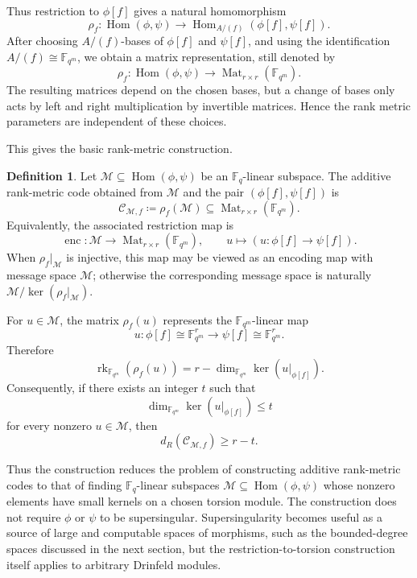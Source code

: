 \documentclass[10pt,a4paper]{amsart}
\DeclareMathOperator{\Hom}{Hom}
\DeclareMathOperator{\Mat}{Mat}
\DeclareMathOperator{\rk}{rk}
\DeclareMathOperator{\enc}{enc}
\theoremstyle{definition}
\newtheorem{definition}{Definition}[section]
\theoremstyle{plain}
\theoremstyle{remark}
\newcommand{\vF}{\mathbb F}
\begin{document}
Thus restriction to $\phi[f]$ gives a natural homomorphism
$$
\rho_f:\Hom(\phi,\psi)\longrightarrow \Hom_{A/(f)}(\phi[f],\psi[f]).
$$
After choosing $A/(f)$-bases of $\phi[f]$ and $\psi[f]$, and using the identification $A/(f)\cong \vF_{q^m}$, we obtain a matrix representation, still denoted by
$$
\rho_f:\Hom(\phi,\psi)\longrightarrow \Mat_{r\times r}(\vF_{q^m}).
$$
The resulting matrices depend on the chosen bases, but a change of bases only acts by left and right multiplication by invertible matrices. Hence the rank metric parameters are independent of these choices.

This gives the basic rank-metric construction.

\begin{definition}
Let $\mathcal M\subseteq \Hom(\phi,\psi)$ be an $\vF_q$-linear subspace. The additive rank-metric code obtained from $\mathcal M$ and the pair $(\phi[f],\psi[f])$ is
$$
\mathcal C_{\mathcal M,f}\coloneqq \rho_f(\mathcal M)
\subseteq \Mat_{r\times r}(\vF_{q^m}).
$$
Equivalently, the associated restriction map is
$$
\enc:\mathcal M\longrightarrow \Mat_{r\times r}(\vF_{q^m}),
\qquad
u\longmapsto \left(u:\phi[f]\rightarrow\psi[f]\right).
$$
When $\rho_f|_{\mathcal M}$ is injective, this map may be viewed as an encoding map with message space $\mathcal M$; otherwise the corresponding message space is naturally $\mathcal M/\ker(\rho_f|_{\mathcal M})$.
\end{definition}

For $u\in\mathcal M$, the matrix $\rho_f(u)$ represents the $\vF_{q^m}$-linear map
$$
u:\phi[f]\cong \vF_{q^m}^r\longrightarrow\psi[f]\cong \vF_{q^m}^r.
$$
Therefore
$$
\rk_{\vF_{q^m}}(\rho_f(u))
=
r-\dim_{\vF_{q^m}}\ker\left(u|_{\phi[f]}\right).
$$
Consequently, if there exists an integer $t$ such that
$$
\dim_{\vF_{q^m}}\ker\left(u|_{\phi[f]}\right)\leq t
$$
for every nonzero $u\in\mathcal M$, then
$$
d_R(\mathcal C_{\mathcal M,f})\geq r-t.
$$

Thus the construction reduces the problem of constructing additive rank-metric codes to that of finding $\vF_q$-linear subspaces $\mathcal M\subseteq \Hom(\phi,\psi)$ whose nonzero elements have small kernels on a chosen torsion module. The construction does not require $\phi$ or $\psi$ to be supersingular. Supersingularity becomes useful as a source of large and computable spaces of morphisms, such as the bounded-degree spaces discussed in the next section, but the restriction-to-torsion construction itself applies to arbitrary Drinfeld modules.
\end{document}
